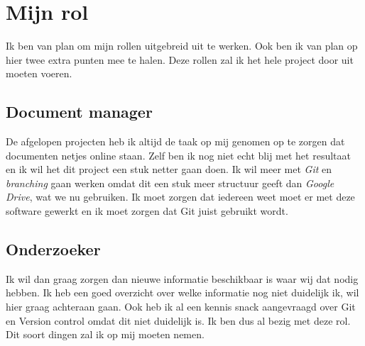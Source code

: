 \documentclass{article}
\begin{document}
\newpage

\section{Mijn rol}

Ik ben van plan om mijn rollen uitgebreid uit te werken.
Ook ben ik van plan op hier twee extra punten mee te halen.
Deze rollen zal ik het hele project door uit moeten voeren.

\subsection{Document manager}

De afgelopen projecten heb ik altijd de taak op mij genomen op te zorgen dat documenten netjes online staan.
Zelf ben ik nog niet echt blij met het resultaat en ik wil het dit project een stuk netter gaan doen.
Ik wil meer met \emph{Git} en \emph{branching} gaan werken omdat dit een stuk meer structuur geeft dan \emph{Google Drive}, wat we nu gebruiken.
Ik moet zorgen dat iedereen weet moet er met deze software gewerkt en ik moet zorgen dat Git juist gebruikt wordt.

\subsection{Onderzoeker}
Ik wil dan graag zorgen dan nieuwe informatie beschikbaar is waar wij dat nodig hebben.
Ik heb een goed overzicht over welke informatie nog niet duidelijk ik, wil hier graag achteraan gaan. 
Ook heb ik al een kennis snack aangevraagd over Git en Version control omdat dit niet duidelijk is.
Ik ben dus al bezig met deze rol.
Dit soort dingen zal ik op mij moeten nemen.
\end{document}
